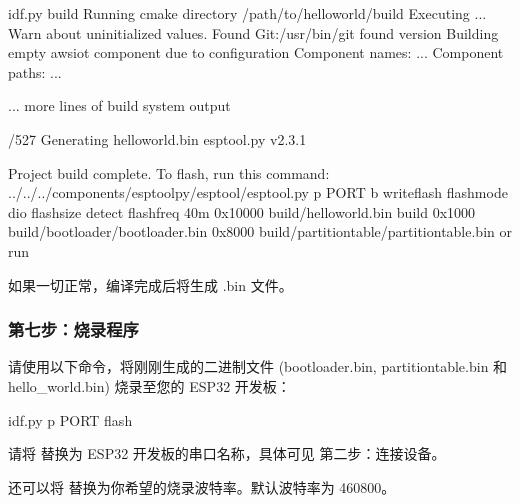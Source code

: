 \documentclass[a4paper,12pt,english]{sphinxmanual}
\begin{document}
\begin{sphinxVerbatim}[commandchars=\\\{\}]
\PYGZdl{} idf.py build
Running cmake  directory /path/to/hello\PYGZus{}world/build
Executing ...
Warn about uninitialized values.
\PYGZhy{}\PYGZhy{} Found Git:/usr/bin/git found version 
\PYGZhy{}\PYGZhy{} Building empty aws\PYGZus{}iot component due to configuration
\PYGZhy{}\PYGZhy{} Component names: ...
\PYGZhy{}\PYGZhy{} Component paths: ...

... more lines of build system output

\PYG{o}{[}/527\PYG{o}{]} Generating hello\PYGZus{}world.bin
esptool.py v2.3.1

Project build complete. To flash, run this command:
../../../components/esptool\PYGZus{}py/esptool/esptool.py \PYGZhy{}p PORT \PYGZhy{}b  write\PYGZus{}flash \PYGZhy{}\PYGZhy{}flash\PYGZus{}mode dio \PYGZhy{}\PYGZhy{}flash\PYGZus{}size detect \PYGZhy{}\PYGZhy{}flash\PYGZus{}freq 40m 0x10000 build/hello\PYGZus{}world.bin  build 0x1000 build/bootloader/bootloader.bin 0x8000 build/partition\PYGZus{}table/partition\PYGZhy{}table.bin
or run 
\end{sphinxVerbatim}

\sphinxAtStartPar
如果一切正常，编译完成后将生成 .bin 文件。


\subsubsection{第七步：烧录程序}
\label{\detokenize{exp-esp32/ide/esp-idf-cli:id11}}
\sphinxAtStartPar
请使用以下命令，将刚刚生成的二进制文件 (bootloader.bin, partition\sphinxhyphen{}table.bin 和 hello\_world.bin) 烧录至您的 ESP32 开发板：

\begin{sphinxVerbatim}[commandchars=\\\{\}]
idf.py \PYGZhy{}p PORT flash
\end{sphinxVerbatim}

\sphinxAtStartPar
请将  替换为 ESP32 开发板的串口名称，具体可见 第二步：连接设备。

\sphinxAtStartPar
还可以将  替换为你希望的烧录波特率。默认波特率为 460800。
\end{document}
